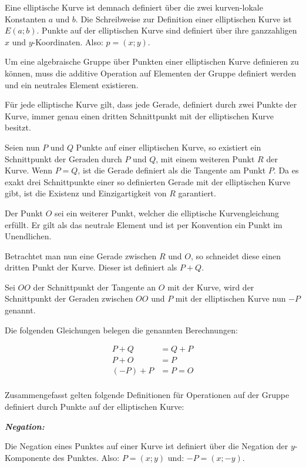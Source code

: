 Eine elliptische Kurve ist demnach definiert über die zwei kurven-lokale Konstanten $a$ und $b$.
Die Schreibweise zur Definition einer elliptischen Kurve ist $E(a;b)$.
Punkte auf der elliptischen Kurve sind definiert über ihre ganzzahligen $x$ und $y$-Koordinaten. Also: $p = (x;y)$.

Um eine algebraische Gruppe über Punkten einer elliptischen Kurve definieren zu können, muss die additive
Operation auf Elementen der Gruppe definiert werden und ein neutrales Element existieren.

Für jede elliptische Kurve gilt, dass jede Gerade, definiert durch zwei Punkte der Kurve, immer genau einen
dritten Schnittpunkt mit der elliptischen Kurve besitzt.

Seien nun $P$ und $Q$ Punkte auf einer elliptischen Kurve, so existiert ein Schnittpunkt der Geraden durch $P$
und $Q$, mit einem weiteren Punkt $R$ der Kurve. Wenn $P = Q$, ist die Gerade definiert als die Tangente am
Punkt $P$. Da es exakt drei Schnittpunkte einer so definierten Gerade mit der elliptischen Kurve gibt, 
ist die Existenz und Einzigartigkeit von $R$ garantiert.

Der Punkt $O$ sei ein weiterer Punkt, welcher die elliptische Kurvengleichung erfüllt. Er gilt als das neutrale
Element und ist per Konvention ein Punkt im Unendlichen.

Betrachtet man nun eine Gerade zwischen $R$ und $O$, so schneidet diese einen dritten Punkt der Kurve. 
Dieser ist definiert als $P + Q$.

Sei $OO$ der Schnittpunkt der Tangente an $O$ mit der Kurve, wird der Schnittpunkt der Geraden zwischen $OO$ und $P$ mit der elliptischen Kurve nun $-P$ genannt\cite{explicit_addition}.

Die folgenden Gleichungen belegen die genannten Berechnungen:

\begin{align*}
P + Q    &= Q + P \\
P + O    &= P \\
(-P) + P &= P = O \\
\end{align*}

Zusammengefasst gelten folgende Definitionen für Operationen auf der Gruppe definiert durch Punkte auf der 
elliptischen Kurve:

\newpage

\textit{\textbf{Negation:}}

Die Negation eines Punktes auf einer Kurve ist definiert über die Negation der $y$-Komponente des Punktes.
Also: $P = (x;y)$ und: $-P = (x;-y)$.

